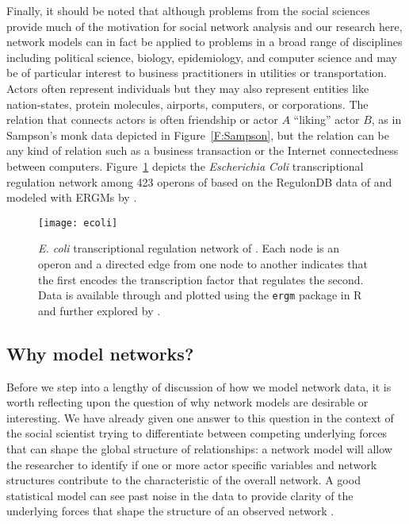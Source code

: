 Finally, it should be noted that although problems from the social sciences provide much of the 
motivation for social network analysis and our research here, network models can in 
fact be applied to problems in a broad range of disciplines including political 
science, biology, epidemiology, and computer science and may be of particular interest
to business practitioners in utilities or transportation.  
Actors often represent individuals but 
they may also represent entities like nation-states, protein molecules, airports, 
computers, or corporations.  The relation that connects actors 
is often friendship or actor $A$ 
``liking'' actor $B$, as in Sampson's monk data depicted in Figure~\ref{F:Sampson}, 
but the relation can be any kind of relation such as a business transaction or the 
Internet connectedness between computers.  Figure~\ref{F:ecoli} depicts the 
\textit{Escherichia Coli} transcriptional regulation network among 423 operons of
\citet*{Shen-Orr} based on the RegulonDB data of \citet*{Salgado} and modeled with 
ERGMs by \citet*{Saul:2007,Hummel}.

\begin{figure}[h]
\begin{center}
\texttt{[image: ecoli]}
\end{center}
\caption[\textit{E. coli} transcriptional regulation network of \citet{Shen-Orr}]{\textit{E. coli} transcriptional regulation network of \citet{Shen-Orr}.  Each node is an operon and a directed edge from one node to another indicates 
that the first encodes the transcription factor that regulates the second.
Data is available through and plotted using the \texttt{ergm} package \citep{ergm:R} in 
R and further explored by \citet{Hummel}.}
\label{F:ecoli}
\end{figure}



\subsection{Why model networks?}
Before we step into a lengthy of discussion of how we model network data, it is 
worth reflecting upon the question of why network models are desirable or interesting.  We 
have already given one answer to this question in the context of the social scientist 
trying to differentiate between competing underlying forces that can shape the global 
structure of relationships: a network model will allow the researcher to 
identify if one or more actor specific variables and network structures 
contribute to the characteristic of the overall network.  A good statistical 
model can see past noise in the data to
provide clarity of the underlying forces that shape the structure of an observed network
\citep*{Goodreau:2009}.   


